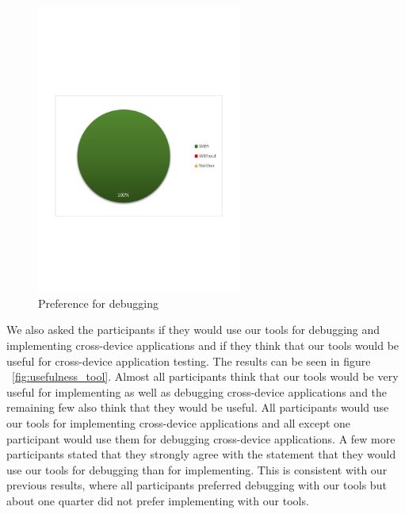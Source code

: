 \begin{figure}[H]
  \centering
    \includegraphics[width=0.6\textwidth]{images/charts/prefer_debugging.pdf}
	\caption{Preference for debugging}
	\label{fig:prefer_debugging}
\end{figure}


We also asked the participants if they would use our tools for debugging and implementing cross-device applications and if they think that our tools would be useful for cross-device application testing. The results can be seen in figure ~\ref{fig:usefulness_tool}. Almost all participants think that our tools would be very useful for implementing as well as debugging cross-device applications and the remaining few also think that they would be useful. All participants would use our tools for implementing cross-device applications and all except one participant would use them for debugging cross-device applications. A few more participants stated that they strongly agree with the statement that they would use our tools for debugging than for implementing. This is consistent with our previous results, where all participants preferred debugging with our tools but about one quarter did not prefer implementing with our tools.

